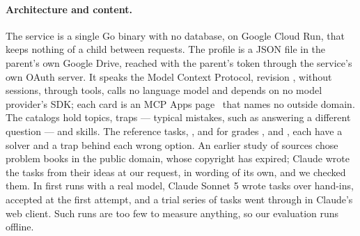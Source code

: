 \paragraph{Architecture and content.} The service is a single Go binary with no database, on Google Cloud Run, that keeps nothing of a child between requests. The profile is a JSON file in the parent's own Google Drive, reached with the parent's token through the service's own OAuth server. It speaks the Model Context Protocol, revision , without sessions, through  tools, calls no language model and depends on no model provider's SDK; each card is an MCP Apps page~\cite{mcpapps2026} that names no outside domain. The catalogs hold  topics,  traps --- typical mistakes, such as answering a different question --- and  skills. The  reference tasks, ,  and  for grades ,  and , each have a solver and a trap behind each wrong option. An earlier study of sources chose problem books in the public domain, whose copyright has expired; Claude wrote the tasks from their ideas at our request, in wording of its own, and we checked them. In first runs with a real model, Claude Sonnet 5 wrote  tasks over  hand-ins,  accepted at the first attempt, and a trial series of  tasks went through in Claude's web client. Such runs are too few to measure anything, so our evaluation runs offline.
